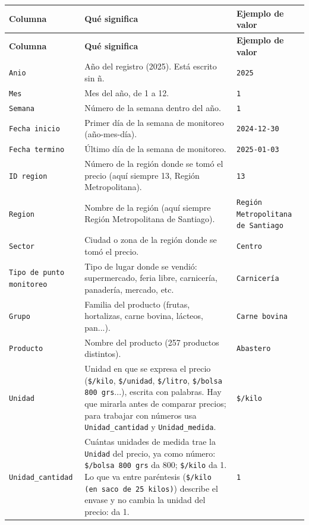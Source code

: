 \documentclass[10.5pt]{article}
\newcommand{\hdr}[1]{\textbf{\color{white}#1}}
\begin{document}
\begin{xltabular}{\linewidth}{@{}p{4.5cm} >{\raggedright\arraybackslash}X p{3.4cm}@{}}
\hdr{Columna} & \hdr{Qué significa} & \hdr{Ejemplo de valor} \\
\endfirsthead
{}\hdr{Columna} & \hdr{Qué significa} & \hdr{Ejemplo de valor} \\
\endhead
\texttt{Anio} & Año del registro (2025). Está escrito sin ñ. & \texttt{2025} \\
\texttt{Mes} & Mes del año, de 1 a 12. & \texttt{1} \\
\texttt{Semana} & Número de la semana dentro del año. & \texttt{1} \\
\texttt{Fecha inicio} & Primer día de la semana de monitoreo (año-mes-día). & \texttt{2024-12-30} \\
\texttt{Fecha termino} & Último día de la semana de monitoreo. & \texttt{2025-01-03} \\
\texttt{ID region} & Número de la región donde se tomó el precio (aquí siempre 13, Región Metropolitana). & \texttt{13} \\
\texttt{Region} & Nombre de la región (aquí siempre Región Metropolitana de Santiago). & \texttt{Región Metropolitana de Santiago} \\
\texttt{Sector} & Ciudad o zona de la región donde se tomó el precio. & \texttt{Centro} \\
\texttt{Tipo de punto monitoreo} & Tipo de lugar donde se vendió: supermercado, feria libre, carnicería, panadería, mercado, etc. & \texttt{Carnicería} \\
\texttt{Grupo} & Familia del producto (frutas, hortalizas, carne bovina, lácteos, pan...). & \texttt{Carne bovina} \\
\texttt{Producto} & Nombre del producto (257 productos distintos). & \texttt{Abastero} \\
\texttt{Unidad} & Unidad en que se expresa el precio (\texttt{\$/\allowbreak{}kilo}, \texttt{\$/\allowbreak{}unidad}, \texttt{\$/\allowbreak{}litro}, \texttt{\$/\allowbreak{}bolsa 800 grs}...), escrita con palabras. Hay que mirarla antes de comparar precios; para trabajar con números usa \texttt{Unidad\_\allowbreak{}cantidad} y \texttt{Unidad\_\allowbreak{}medida}. & \texttt{\$/\allowbreak{}kilo} \\
\texttt{Unidad\_\allowbreak{}cantidad} & Cuántas unidades de medida trae la \texttt{Unidad} del precio, ya como número: \texttt{\$/\allowbreak{}bolsa 800 grs} da 800; \texttt{\$/\allowbreak{}kilo} da 1. Lo que va entre paréntesis (\texttt{\$/\allowbreak{}kilo (en saco de 25 kilos)}) describe el envase y no cambia la unidad del precio: da 1. & \texttt{1} \\

\end{xltabular}
\end{document}
